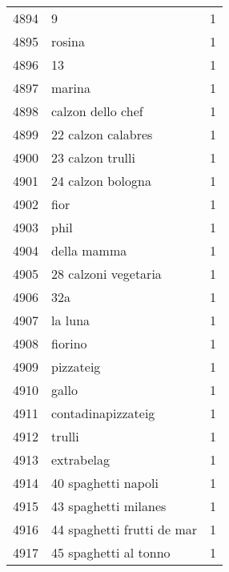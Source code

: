 \begin{tabular}{llr}
4894 &                                                  9 &      1 \\
4895 &                                             rosina &      1 \\
4896 &                                                 13 &      1 \\
4897 &                                             marina &      1 \\
4898 &                                  calzon dello chef &      1 \\
4899 &                                 22 calzon calabres &      1 \\
4900 &                                   23 calzon trulli &      1 \\
4901 &                                  24 calzon bologna &      1 \\
4902 &                                               fior &      1 \\
4903 &                                               phil &      1 \\
4904 &                                        della mamma &      1 \\
4905 &                               28 calzoni vegetaria &      1 \\
4906 &                                                32a &      1 \\
4907 &                                            la luna &      1 \\
4908 &                                            fiorino &      1 \\
4909 &                                          pizzateig &      1 \\
4910 &                                              gallo &      1 \\
4911 &                                 contadinapizzateig &      1 \\
4912 &                                             trulli &      1 \\
4913 &                                         extrabelag &      1 \\
4914 &                                40 spaghetti napoli &      1 \\
4915 &                               43 spaghetti milanes &      1 \\
4916 &                         44 spaghetti frutti de mar &      1 \\
4917 &                              45 spaghetti al tonno &      1 \\

\end{tabular}

